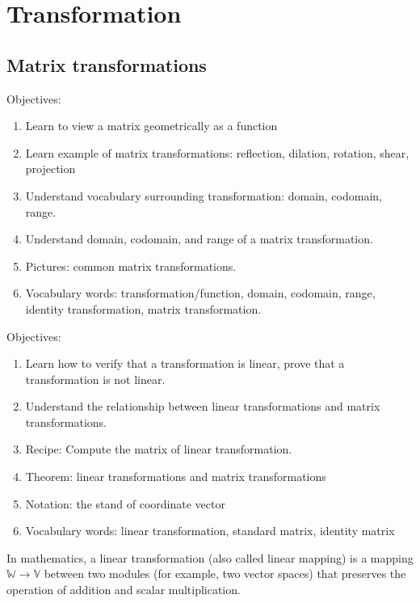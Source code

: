 \documentclass[12pt]{report}
\begin{document}
\chapter{Transformation}

\section{Matrix transformations}
Objectives:
\begin{enumerate}
    \item Learn to view a matrix geometrically as a function
    \item Learn example of matrix transformations: reflection, dilation, rotation, shear, projection
    \item Understand vocabulary surrounding transformation: domain, codomain, range.
    \item Understand domain, codomain, and range of a matrix transformation.
    \item Pictures: common matrix transformations.
    \item Vocabulary words: transformation/function, domain, codomain, range, identity transformation, matrix transformation.
\end{enumerate}

Objectives:
\begin{enumerate}
    \item Learn how to verify that a transformation is linear, prove that a transformation is not linear.
    \item Understand the relationship between linear transformations and matrix transformations.
    \item Recipe: Compute the matrix of linear transformation.
    \item Theorem: linear transformations and matrix transformations
    \item Notation: the stand of coordinate vector
    \item Vocabulary words: linear transformation, standard matrix, identity matrix
  \end{enumerate}


In mathematics, a linear transformation (also called linear mapping) is a mapping $\mathbb{W} \to \mathbb{V}$ between two modules (for example, two vector spaces) that preserves the operation of addition and scalar multiplication.
\end{document}
